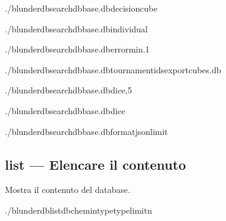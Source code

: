 \documentclass[letterpaper,10pt,italian]{sphinxmanual}
\begin{document}
\sphinxAtStartPar
{}

\begin{sphinxVerbatim}[commandchars=\\\{\}]
./blunderdbsearch\PYGZhy{}\PYGZhy{}dbbase.db\PYGZhy{}\PYGZhy{}decisioncube

./blunderdbsearch\PYGZhy{}\PYGZhy{}dbbase.db\PYGZhy{}\PYGZhy{}individual

./blunderdbsearch\PYGZhy{}\PYGZhy{}dbbase.db\PYGZhy{}\PYGZhy{}error\PYGZhy{}min.1

./blunderdbsearch\PYGZhy{}\PYGZhy{}dbbase.db\PYGZhy{}\PYGZhy{}tournament\PYGZhy{}ids\PYGZhy{}\PYGZhy{}exportcubes.db

./blunderdbsearch\PYGZhy{}\PYGZhy{}dbbase.db\PYGZhy{}\PYGZhy{}dice,5

./blunderdbsearch\PYGZhy{}\PYGZhy{}dbbase.db\PYGZhy{}\PYGZhy{}dice

./blunderdbsearch\PYGZhy{}\PYGZhy{}dbbase.db\PYGZhy{}\PYGZhy{}formatjson\PYGZhy{}\PYGZhy{}limit
\end{sphinxVerbatim}


\subsection{list — Elencare il contenuto}
\label{\detokenize{cli:list-lister-le-contenu}}
\sphinxAtStartPar
Mostra il contenuto del database.

\begin{sphinxVerbatim}[commandchars=\\\{\}]
./blunderdblist\PYGZhy{}\PYGZhy{}db\PYGZlt{}chemin\PYGZgt{}\PYGZhy{}\PYGZhy{}type\PYGZlt{}type\PYGZgt{}\PYG{o}{[}\PYGZhy{}\PYGZhy{}limit\PYGZlt{}n\PYGZgt{}\PYG{o}{]}
\end{sphinxVerbatim}
\end{document}
